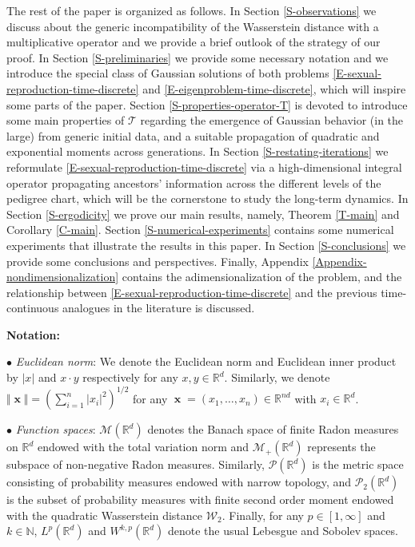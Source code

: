 \documentclass[reqno]{amsart}
\DeclareMathOperator{\bx}{\mathbf{x}}
\numberwithin{equation}{section}
\begin{document}
{The rest of the paper is organized as follows. In Section \ref{S-observations} we discuss about the generic incompatibility of the Wasserstein distance with a multiplicative operator and we provide a brief outlook of the strategy of our proof. In Section \ref{S-preliminaries} we provide some necessary notation and we introduce the special class of Gaussian solutions of both problems \eqref{E-sexual-reproduction-time-discrete} and \eqref{E-eigenproblem-time-discrete}, which will inspire some parts of the paper. Section \ref{S-properties-operator-T} is devoted to introduce some main properties of $\mathcal{T}$ regarding the emergence of Gaussian behavior (in the large) from generic initial data, and a suitable propagation of quadratic and exponential moments across generations. In Section \ref{S-restating-iterations} we reformulate \eqref{E-sexual-reproduction-time-discrete} via a high-dimensional integral operator propagating ancestors' information across the different levels of the pedigree chart, which will be the cornerstone to study the long-term dynamics. In Section \ref{S-ergodicity} we prove our main results, namely, Theorem \ref{T-main} and Corollary \ref{C-main}. Section \ref{S-numerical-experiments} contains some numerical experiments that illustrate the results in this paper. In Section \ref{S-conclusions} we provide some conclusions and perspectives. Finally, Appendix \ref{Appendix-nondimensionalization} contains the adimensionalization of the problem, and the relationship between \eqref{E-sexual-reproduction-time-discrete} and the previous time-continuous analogues in the literature is discussed. 


\medskip

{\bf Notation:}

\noindent $\bullet$ {\it Euclidean norm}: We denote the Euclidean norm and Euclidean inner product by $\vert x\vert$ and $x\cdot y$ respectively for any $x,y\in \mathbb{R}^d$. Similarly, we denote $\Vert \bx\Vert=(\sum_{i=1}^n \vert x_i\vert^2)^{1/2}$ for any $\bx=(x_1,\ldots,x_n)\in \mathbb{R}^{nd}$ with $x_i\in \mathbb{R}^d$.

\noindent $\bullet$ {\it Function spaces}: $\mathcal{M}(\mathbb{R}^d)$ denotes the Banach space of finite Radon measures on $\mathbb{R}^d$ endowed with the total variation norm and $\mathcal{M}_+(\mathbb{R}^d)$ represents the subspace of non-negative Radon measures. Similarly, $\mathcal{P}(\mathbb{R}^d)$ is the metric space consisting of probability measures endowed with narrow topology, and $\mathcal{P}_2(\mathbb{R}^d)$ is the subset of probability measures with finite second order moment endowed with the quadratic Wasserstein distance $\mathcal{W}_2$. Finally, for any $p\in [1,\infty]$ and $k\in \mathbb{N}$, $L^p(\mathbb{R}^d)$ and $W^{k,p}(\mathbb{R}^d)$ denote the usual Lebesgue and Sobolev spaces.

}
\end{document}
